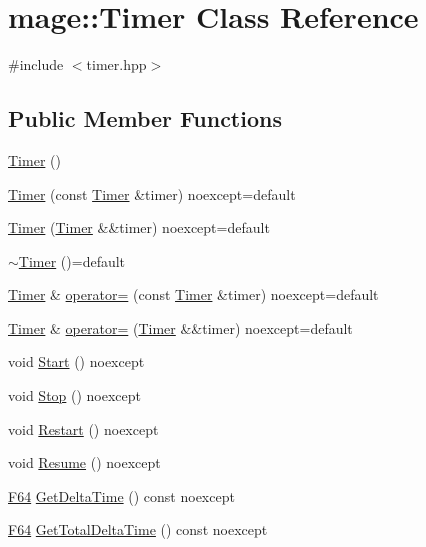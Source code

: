 \hypertarget{classmage_1_1_timer}{}\section{mage\+:\+:Timer Class Reference}
\label{classmage_1_1_timer}


{\ttfamily \#include $<$timer.\+hpp$>$}

\subsection*{Public Member Functions}
\begin{DoxyCompactItemize}
\item 
\hyperlink{classmage_1_1_timer_a5e1c0a3bb4491b3a43ce05874ad24055}{Timer} ()
\item 
\hyperlink{classmage_1_1_timer_ae792c5a546deb35e5e65ed7fe6a8d281}{Timer} (const \hyperlink{classmage_1_1_timer}{Timer} \&timer) noexcept=default
\item 
\hyperlink{classmage_1_1_timer_a9fde919b6040a044748e98f59e18bece}{Timer} (\hyperlink{classmage_1_1_timer}{Timer} \&\&timer) noexcept=default
\item 
\hyperlink{classmage_1_1_timer_a66d6964a6d42eef72f7312f1233e4f74}{$\sim$\+Timer} ()=default
\item 
\hyperlink{classmage_1_1_timer}{Timer} \& \hyperlink{classmage_1_1_timer_a607d4bce80a92977bc8394c8774a6434}{operator=} (const \hyperlink{classmage_1_1_timer}{Timer} \&timer) noexcept=default
\item 
\hyperlink{classmage_1_1_timer}{Timer} \& \hyperlink{classmage_1_1_timer_a38d7c1fe4c4061c56286183032dc67d8}{operator=} (\hyperlink{classmage_1_1_timer}{Timer} \&\&timer) noexcept=default
\item 
void \hyperlink{classmage_1_1_timer_a60e9e329f1e71a6e25351ff6dbcc1b92}{Start} () noexcept
\item 
void \hyperlink{classmage_1_1_timer_aa880e02bfeea2d082a5f34e497bd6500}{Stop} () noexcept
\item 
void \hyperlink{classmage_1_1_timer_a47e6893e733911624ebf54d5f88cd3fd}{Restart} () noexcept
\item 
void \hyperlink{classmage_1_1_timer_ab3cfad4fd61d52852181f7a060069892}{Resume} () noexcept
\item 
\hyperlink{namespacemage_ad26233bbec640deda836e572c1a23708}{F64} \hyperlink{classmage_1_1_timer_a49d36d6d60530a55af210abd01577365}{Get\+Delta\+Time} () const noexcept
\item 
\hyperlink{namespacemage_ad26233bbec640deda836e572c1a23708}{F64} \hyperlink{classmage_1_1_timer_a21ee76bc048a3c80f1bfbbbd807e97a7}{Get\+Total\+Delta\+Time} () const noexcept
\end{DoxyCompactItemize}

